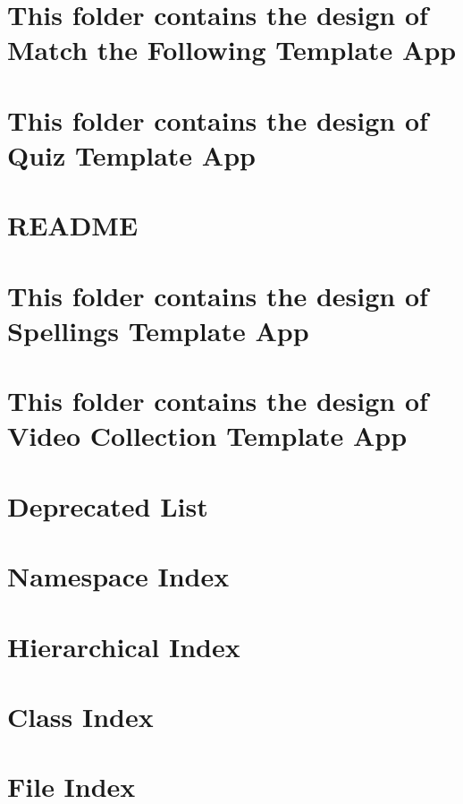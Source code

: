\documentclass[twoside]{book}
\newcommand{\+}{\discretionary{\mbox{\scriptsize$\hookleftarrow$}}{}{}}
\begin{document}
\chapter{This folder contains the design of Match the Following Template App}
\label{md_ui-design_MatchTheFollowing_README}
\hypertarget{md_ui-design_MatchTheFollowing_README}{}

\chapter{This folder contains the design of Quiz Template App}
\label{md_ui-design_Quiz_README}
\hypertarget{md_ui-design_Quiz_README}{}

\chapter{R\+E\+A\+D\+ME}
\label{md_ui-design_README}
\hypertarget{md_ui-design_README}{}

\chapter{This folder contains the design of Spellings Template App}
\label{md_ui-design_spelling_README}
\hypertarget{md_ui-design_spelling_README}{}

\chapter{This folder contains the design of Video Collection Template App}
\label{md_ui-design_Video_README}
\hypertarget{md_ui-design_Video_README}{}

\chapter{Deprecated List}
\label{deprecated}
\hypertarget{deprecated}{}

\chapter{Namespace Index}

\chapter{Hierarchical Index}

\chapter{Class Index}

\chapter{File Index}

\end{document}
